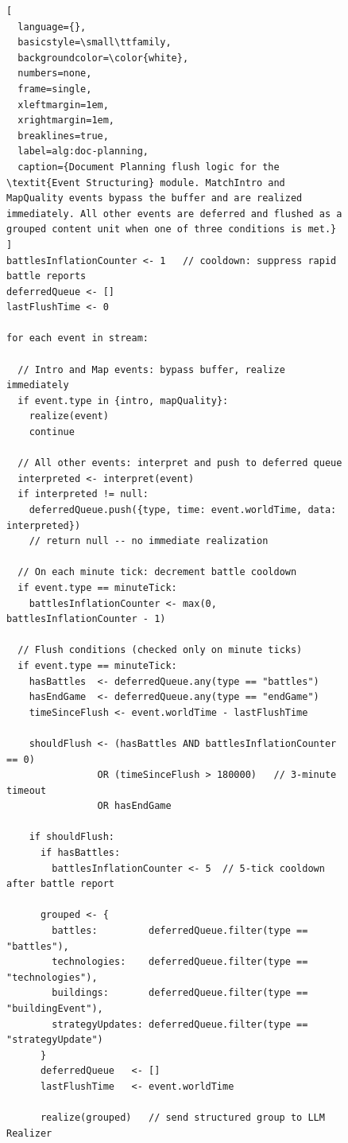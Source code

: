 \begin{figure}[htbp]
\begin{lstlisting}[
  language={},
  basicstyle=\small\ttfamily,
  backgroundcolor=\color{white},
  numbers=none,
  frame=single,
  xleftmargin=1em,
  xrightmargin=1em,
  breaklines=true,
  label=alg:doc-planning,
  caption={Document Planning flush logic for the \textit{Event Structuring} module. MatchIntro and MapQuality events bypass the buffer and are realized immediately. All other events are deferred and flushed as a grouped content unit when one of three conditions is met.}
]
battlesInflationCounter <- 1   // cooldown: suppress rapid battle reports
deferredQueue <- []
lastFlushTime <- 0

for each event in stream:

  // Intro and Map events: bypass buffer, realize immediately
  if event.type in {intro, mapQuality}:
    realize(event)
    continue

  // All other events: interpret and push to deferred queue
  interpreted <- interpret(event)
  if interpreted != null:
    deferredQueue.push({type, time: event.worldTime, data: interpreted})
    // return null -- no immediate realization

  // On each minute tick: decrement battle cooldown
  if event.type == minuteTick:
    battlesInflationCounter <- max(0, battlesInflationCounter - 1)

  // Flush conditions (checked only on minute ticks)
  if event.type == minuteTick:
    hasBattles  <- deferredQueue.any(type == "battles")
    hasEndGame  <- deferredQueue.any(type == "endGame")
    timeSinceFlush <- event.worldTime - lastFlushTime

    shouldFlush <- (hasBattles AND battlesInflationCounter == 0)
                OR (timeSinceFlush > 180000)   // 3-minute timeout
                OR hasEndGame

    if shouldFlush:
      if hasBattles:
        battlesInflationCounter <- 5  // 5-tick cooldown after battle report

      grouped <- {
        battles:         deferredQueue.filter(type == "battles"),
        technologies:    deferredQueue.filter(type == "technologies"),
        buildings:       deferredQueue.filter(type == "buildingEvent"),
        strategyUpdates: deferredQueue.filter(type == "strategyUpdate")
      }
      deferredQueue   <- []
      lastFlushTime   <- event.worldTime

      realize(grouped)   // send structured group to LLM Realizer
\end{lstlisting}
\end{figure}

